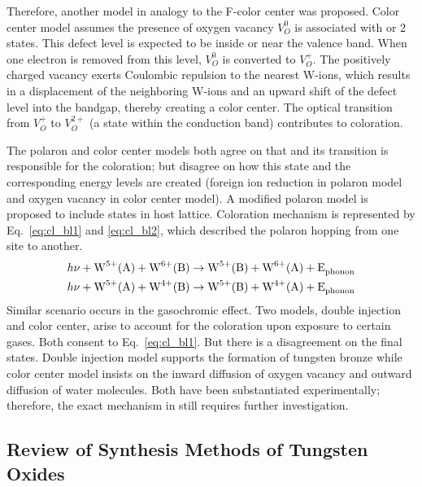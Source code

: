 Therefore, another model in analogy to the F-color center was proposed. Color center model assumes the presence of oxygen vacancy $V_O^0$ is associated with  or 2 states. This defect level is expected to be inside or near the valence band. When one electron is removed from this level, $V_O^0$ is converted to $V_O^+$. The positively charged vacancy exerts Coulombic repulsion to the nearest W-ions, which results in a displacement of the neighboring W-ions and an upward shift of the defect level into the bandgap, thereby creating a color center. The optical transition from $V_O^+$ to $V_O^{2+}$ (a state within the conduction band) contributes to coloration.\cite{Deb2008}

The polaron and color center models both agree on that  and its transition is responsible for the coloration; but disagree on how this  state and the corresponding energy levels are created (foreign ion reduction in polaron model and oxygen vacancy in color center model). A modified polaron model is proposed to include  states in host lattice. Coloration mechanism is represented by Eq.~\ref{eq:cl_bl1} and \ref{eq:cl_bl2}, which described the polaron hopping from one site to another.\cite{Chatten2005}
\begin{align}
h\nu +\ce{W^{5+}(A)} +  \ce{W^{6+}(B)} &\rightarrow \ce{W^{5+}(B)} + \ce{W^{6+}(A) + E_{phonon}} \label{eq:cl_bl1}\\
h\nu +\ce{W^{5+}(A)} +  \ce{W^{4+}(B)} &\rightarrow \ce{W^{5+}(B)} + \ce{W^{4+}(A) + E_{phonon}} \label{eq:cl_bl2}
\end{align}
Similar scenario occurs in the gasochromic effect. Two models, double injection and color center, arise to account for the coloration upon exposure to certain gases. Both consent to Eq.~\ref{eq:cl_bl1}. But there is a disagreement on the final states. Double injection model supports the formation of tungsten bronze  while color center model insists on the inward diffusion of oxygen vacancy and outward diffusion of water molecules. Both have been substantiated experimentally;\cite{Zhu2010} therefore, the exact mechanism in  still requires further investigation.

\subsection{Review of Synthesis Methods of Tungsten Oxides}\label{sec:woxgrowth}

